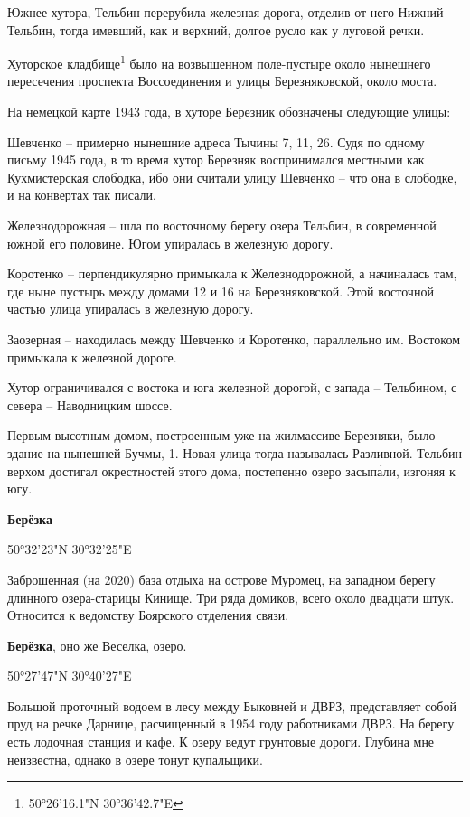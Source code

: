Южнее хутора, Тельбин перерубила железная дорога, отделив от него Нижний Тельбин, тогда имевший, как и верхний, долгое русло как у луговой речки.

Хуторское кладбище\footnote{50°26'16.1"N 30°36'42.7"E} было на возвышенном поле-пустыре около нынешнего пересечения проспекта Воссоединения и улицы Березняковской, около моста.

На немецкой карте 1943 года, в хуторе Березник обозначены следующие улицы: 

Шевченко – примерно нынешние адреса Тычины 7, 11, 26. Судя по одному письму 1945 года, в то время хутор Березняк воспринимался местными как Кухмистерская слободка, ибо они считали улицу Шевченко – что она в слободке, и на конвертах так писали.

Железнодорожная – шла по восточному берегу озера Тельбин, в современной южной его половине. Югом упиралась в железную дорогу.

Коротенко – перпендикулярно примыкала к Железнодорожной, а начиналась там, где ныне пустырь между домами 12 и 16 на Березняковской. Этой восточной частью улица упиралась в железную дорогу.

Заозерная – находилась между Шевченко и Коротенко, параллельно им. Востоком примыкала к железной дороге.

Хутор ограничивался с востока и юга железной дорогой, с запада – Тельбином, с севера – Наводницким шоссе.

Первым высотным домом, построенным уже на жилмассиве Березняки, было здание на нынешней Бучмы, 1. Новая улица тогда называлась Разливной. Тельбин верхом достигал окрестностей этого дома, постепенно озеро засып\'али, изгоняя к югу.\\

\medskip

\textbf{Берёзка} 

50°32'23"N   30°32'25"E

Заброшенная (на 2020) база отдыха на острове Муромец, на западном берегу длинного озера-старицы Кинище. Три ряда домиков, всего около двадцати штук. Относится к ведомству Боярского отделения связи.\\

\medskip

\textbf{Берёзка}, оно же Веселка, озеро.

50°27'47"N 30°40'27"E

Большой проточный водоем в лесу между Быковней и ДВРЗ, представляет собой пруд на речке Дарнице, расчищенный в 1954 году работниками ДВРЗ. На берегу есть лодочная станция и кафе. К озеру ведут грунтовые дороги. Глубина мне неизвестна, однако в озере тонут купальщики.

